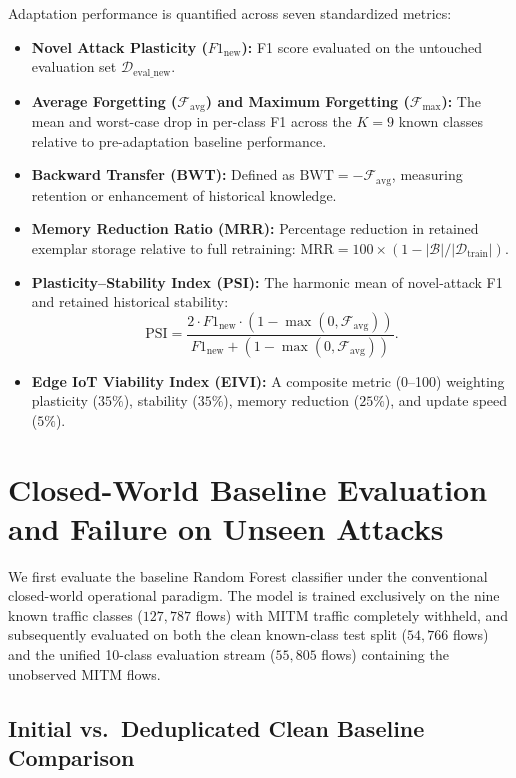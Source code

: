 Adaptation performance is quantified across seven standardized metrics:
\begin{itemize}
    \item \textbf{Novel Attack Plasticity ($F1_{\text{new}}$):} F1 score evaluated on the untouched evaluation set $\mathcal{D}_{\text{eval\_new}}$.
    \item \textbf{Average Forgetting ($\mathcal{F}_{\text{avg}}$) and Maximum Forgetting ($\mathcal{F}_{\max}$):} The mean and worst-case drop in per-class F1 across the $K=9$ known classes relative to pre-adaptation baseline performance.
    \item \textbf{Backward Transfer (BWT):} Defined as $\text{BWT} = -\mathcal{F}_{\text{avg}}$, measuring retention or enhancement of historical knowledge.
    \item \textbf{Memory Reduction Ratio (MRR):} Percentage reduction in retained exemplar storage relative to full retraining: $\text{MRR} = 100 \times (1 - |\mathcal{B}| / |\mathcal{D}_{\text{train}}|)$.
    \item \textbf{Plasticity--Stability Index (PSI):} The harmonic mean of novel-attack F1 and retained historical stability:
    \begin{equation}
    \text{PSI} = \frac{2 \cdot F1_{\text{new}} \cdot (1 - \max(0, \mathcal{F}_{\text{avg}}))}{F1_{\text{new}} + (1 - \max(0, \mathcal{F}_{\text{avg}}))}.
    \end{equation}
    \item \textbf{Edge IoT Viability Index (EIVI):} A composite metric (0--100) weighting plasticity ($35\%$), stability ($35\%$), memory reduction ($25\%$), and update speed ($5\%$).
\end{itemize}

\section{Closed-World Baseline Evaluation and Failure on Unseen Attacks}
\label{sec:phase1_4_results}

We first evaluate the baseline Random Forest classifier under the conventional closed-world operational paradigm. The model is trained exclusively on the nine known traffic classes ($127{,}787$ flows) with MITM traffic completely withheld, and subsequently evaluated on both the clean known-class test split ($54{,}766$ flows) and the unified 10-class evaluation stream ($55{,}805$ flows) containing the unobserved MITM flows.

\subsection{Initial vs.\ Deduplicated Clean Baseline Comparison}
\label{subsec:initial_vs_clean}

